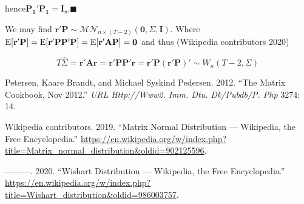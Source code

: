 \documentclass{article}
\newlength{\cslhangindent}
\newenvironment{cslreferences}%
  {\setlength{\parindent}{0pt}%
  \everypar{\setlength{\hangindent}{\cslhangindent}}\ignorespaces}%
  {\par}
\begin{document}
hence\(\mathbf{P_1'P_1=I_s}.\blacksquare\)

We may find
\(\mathbf{r'P}\sim \mathcal{MN}_{n\times(T-2)}(\mathbf{0},\Sigma,\mathbf{I})\).
Where
\(\operatorname{E}[\mathbf{r'P}]=\operatorname{E}[\mathbf{r'PP'P}]=\operatorname{E}[\mathbf{r'AP}]=\mathbf{0}\)
and thus (Wikipedia contributors 2020)

\[ T\hat{\Sigma}=\mathbf{r'Ar}=\mathbf{r'PP'r}=\mathbf{r'P(r'P)'}\sim W_n(T-2,\Sigma) \]

\newpage

\hypertarget{refs}{}
\begin{cslreferences}
\leavevmode\hypertarget{ref-petersen2012matrix}{}%
Petersen, Kaare Brandt, and Michael Syskind Pedersen. 2012. ``The Matrix
Cookbook, Nov 2012.'' \emph{URL Http://Www2. Imm. Dtu. Dk/Pubdb/P. Php}
3274: 14.

\leavevmode\hypertarget{ref-wiki:mnt}{}%
Wikipedia contributors. 2019. ``Matrix Normal Distribution ---
Wikipedia, the Free Encyclopedia.''
\url{https://en.wikipedia.org/w/index.php?title=Matrix_normal_distribution\&oldid=902125596}.

\leavevmode\hypertarget{ref-wiki:wst}{}%
---------. 2020. ``Wishart Distribution --- Wikipedia, the Free
Encyclopedia.''
\url{https://en.wikipedia.org/w/index.php?title=Wishart_distribution\&oldid=986003757}.
\end{cslreferences}



\end{document}
